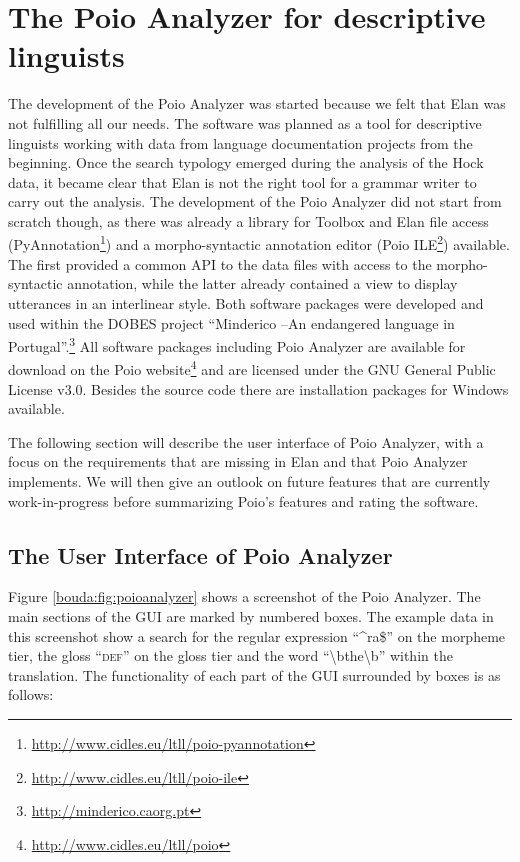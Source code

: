 \section{The Poio Analyzer for descriptive linguists}
\label{bouda:sec:poioanalyzer}
The development of the Poio Analyzer was started because we felt that Elan was not fulfilling all our needs. The software was planned as a tool for descriptive linguists working with data from language documentation projects from the beginning. Once the search typology emerged during the analysis of the Hoc{\A}k data, it became clear that Elan is not the right tool for a grammar writer to carry out the analysis. The development of the Poio Analyzer did not start from scratch though, as there was already a library for Toolbox and Elan file access (PyAnnotation\footnote{ \url{http://www.cidles.eu/ltll/poio-pyannotation}}) and a morpho-syntactic annotation editor (Poio ILE\footnote{\url{http://www.cidles.eu/ltll/poio-ile}}) available. The first provided a common API to the data files with access to the morpho-syntactic annotation, while the latter already contained a view to display utterances in an interlinear style. Both software packages were developed and used within the DOBES project ``Minderico --An endangered language in Portugal''.\footnote{\url{http://minderico.caorg.pt}} All software packages including Poio Analyzer are available for download on the Poio website\footnote{\url{http://www.cidles.eu/ltll/poio}} and are licensed under the GNU General Public License v3.0. Besides the source code there are installation packages for Windows available.

The following section will describe the user interface of Poio Analyzer, with a focus on the requirements that are missing in Elan and that Poio Analyzer implements. We will then give an outlook on future features that are currently work-in-progress before summarizing Poio's features and rating the software.

\subsection{The User Interface of Poio Analyzer}

Figure  \ref{bouda:fig:poioanalyzer} shows a screenshot of the Poio Analyzer. The main sections of the GUI are marked by numbered boxes. The example data in this screenshot show a search for the regular expression ``\^{}ra\$'' on the morpheme tier, the gloss ``\textsc{def}'' on the gloss tier and the word ``{\textbackslash}bthe{\textbackslash}b'' within the translation. The functionality of each part of the GUI surrounded by boxes is as follows:

